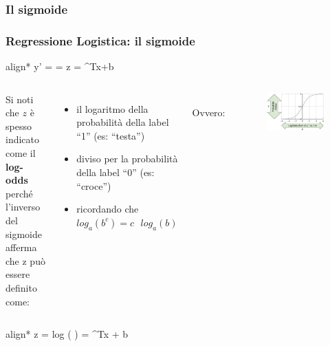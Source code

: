 \subsubsection[Il sigmoide]{Il sigmoide}
\begin{frame}
	
	\frametitle{Regressione Logistica: il sigmoide}
	
	\begin{empheq}[box=\fcolorbox{blue!40!black!60}{yellow!10}]{align*}
	 \quad \Rightarrow \quad y' =  =  \quad {} \quad z = \omega^Tx+b
	\end{empheq}
	
	\begin{columns}
		Si noti che $z$ è spesso indicato come il \textbf{log-odds} perché  l'inverso del sigmoide afferma che z può essere definito come:
		\begin{itemize}
			\item il logaritmo della probabilità della label ``1'' (es: ``testa'')
			\item diviso per la probabilità della label ``0'' (es: ``croce'')
			\item ricordando che $log_a (b^c) = c\text{ }log_a (b)$
		\end{itemize}
		\ \\
		Ovvero:
		\begin{figure}[!htbp]
			\centering
			\includegraphics[width=1.0\linewidth]{images/supervised/z_algoritms_logistic_regression/SigmoidFunction.png}
		\end{figure}
		
	\end{columns}
	
	\begin{empheq}[box=\fcolorbox{blue!40!black!60}{yellow!10}]{align*}
	 \quad \Rightarrow \quad z = log \left( \right) = \omega^Tx + b
	\end{empheq}
	
\end{frame}


